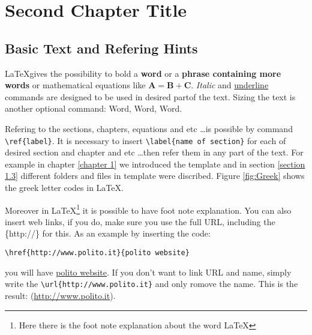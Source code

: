 
\chapter{Second Chapter Title}
\label{chapter 2}
\ifpdf
    \graphicspath{{Chapter2/Figs/}{Chapter2/Figs/PDF/}{Chapter2/Figs/}}
\else
    \graphicspath{{Chapter2/Figs/Vector/}{Chapter2/Figs/}}
\fi
\section{Basic Text and Refering Hints}
\LaTeX gives the possibility to bold a \textbf{word} or a \textbf{phrase containing more words} or mathematical equations like $\mathbf{A=B+C}$. \textit{Italic} and \underline{underline} commands are designed to be used in desired partof the text. Sizing the text is another optional command:
{\small Word}, {\large Word}, {\Large Word}.


Refering to the sections, chapters, equations and etc \dots is possible by command \verb|\ref{label}|. It is necessary to insert \verb|\label{name of section}| for each of desired section and chapter and etc \dots then refer them in any part of the text. For example in chapter \ref{chapter 1} we introduced the template and in section \ref{section 1.3} different folders and files in template were discribed. Figure \ref{fig:Greek} shows the greek letter codes in \LaTeX. 

Moreover in \LaTeX \footnote{Here there is the foot note explanation about the word \LaTeX} it is possible to have foot note explanation. You can also insert web links, if you do, make sure you use the full URL, including the \{http://\} for this. As an example by inserting the code: \begin{verbatim}
\href{http://www.polito.it}{polito website} \end{verbatim} you will have \href{http://www.polito.it}{polito website}. If you don't want to link URL and name, simply write the \verb|\url{http://www.polito.it}| and only romove the name. This is the result: (\url{http://www.polito.it}).

